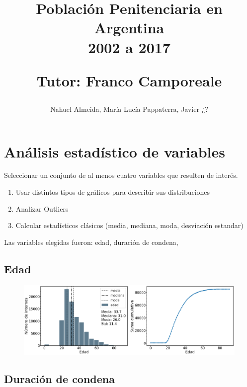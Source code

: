 \documentclass[10pt]{article}
\begin{document}
	
\title{Población Penitenciaria en Argentina\\ 2002 a 2017 \\
	\begin{small}
		Tutor: Franco Camporeale
	\end{small}}
\author{\small{Nahuel Almeida, María Lucía Pappaterra, Javier ¿?}}

\maketitle

\section{Análisis estadístico de variables}

Seleccionar un conjunto de al menos cuatro variables que resulten de interés.

\begin{enumerate}
	\item Usar distintos tipos de gráficos para describir sus distribuciones
	\item Analizar Outliers
	\item Calcular estadísticos clásicos (media, mediana, moda, desviación estandar)
\end{enumerate}

Las variables elegidas fueron: edad, duración de condena, 

\subsection{Edad}

\begin{figure}[H]
	\centering
	\includegraphics[scale=0.28]{graficos/edad.png}
	\caption{}
\end{figure}

\subsection{Duración de condena}
\end{document}
